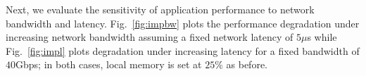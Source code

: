 




Next, we evaluate the sensitivity of application performance to network bandwidth and latency. Fig.~\ref{fig:impbw} plots the performance degradation under increasing network bandwidth assuming a fixed network latency of $5\mu$s while Fig.~\ref{fig:impl} plots degradation under increasing latency for a fixed bandwidth of $40$Gbps; in both cases, local memory is set at $25\%$ as before.

